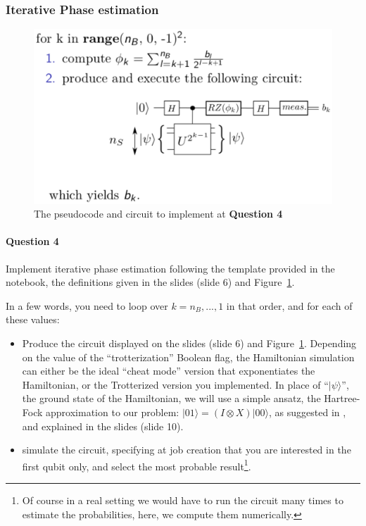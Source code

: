 \documentclass{article}
\begin{document}
\subsubsection{Iterative Phase estimation}

\begin{figure}
\centering
\includegraphics[width=.6\textwidth]{pseudo_code.eps}
\caption{The pseudocode and circuit to implement at \textbf{Question 4}}
\label{pseudocode}
\end{figure}

\paragraph{Question 4} Implement iterative phase estimation following the template provided in the notebook, 
the definitions given in the slides (slide 6) and Figure~\ref{pseudocode}.

In a few words, you need to loop over $k=n_{B},...,1$ in that order, and for each of these values:
\begin{itemize}
\item Produce the circuit displayed on the slides (slide 6) and Figure~\ref{pseudocode}. 
Depending on the value of the ``trotterization'' Boolean
flag, the Hamiltonian simulation can either be the ideal ``cheat mode'' version that exponentiates the Hamiltonian,
or the Trotterized version you implemented. In place of ``$|\psi\rangle$'', the ground state of the Hamiltonian,
we will use a simple ansatz, the Hartree-Fock approximation to our problem: $|01\rangle=(I\otimes X)|00\rangle$, as suggested in
\textcolor{blue}{\cite{o2016scalable}}, and explained in the slides (slide 10).
\item simulate the circuit, specifying at job creation that you are interested in the first qubit only, and 
select the most probable result\footnote{Of course in a real setting we would have to run the circuit many times
to estimate the probabilities, here, we compute them numerically.}.
\end{itemize}
\end{document}
